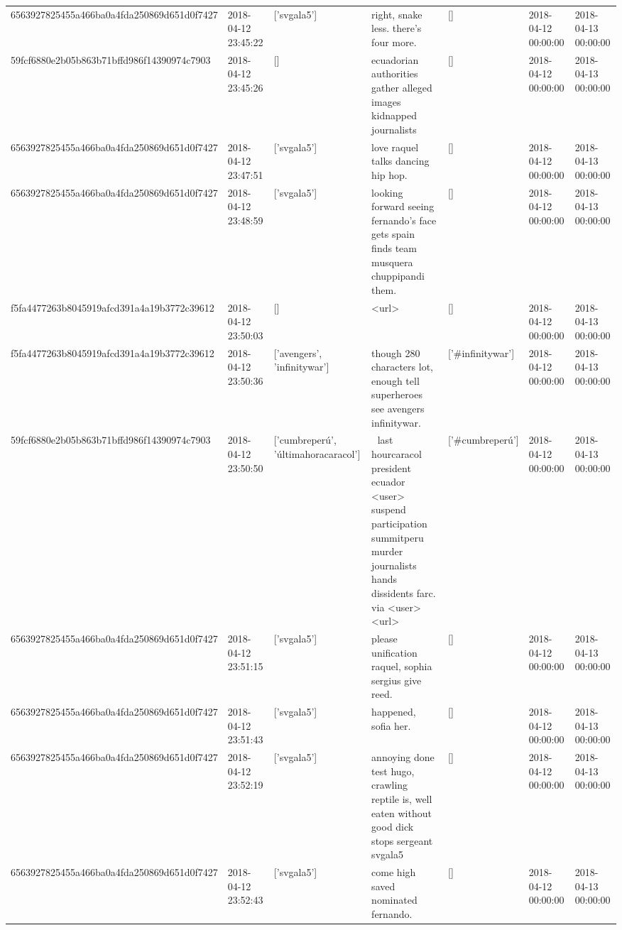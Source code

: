 \begin{tabular}{lllllll}
6563927825455a466ba0a4fda250869d651d0f7427 & 2018-04-12 23:45:22 & ['svgala5'] & right, snake less. there's four more. & [] & 2018-04-12 00:00:00 & 2018-04-13 00:00:00 \\
59fcf6880e2b05b863b71bffd986f14390974c7903 & 2018-04-12 23:45:26 & [] & ecuadorian authorities gather alleged images kidnapped journalists & [] & 2018-04-12 00:00:00 & 2018-04-13 00:00:00 \\
6563927825455a466ba0a4fda250869d651d0f7427 & 2018-04-12 23:47:51 & ['svgala5'] & love raquel talks dancing hip hop. & [] & 2018-04-12 00:00:00 & 2018-04-13 00:00:00 \\
6563927825455a466ba0a4fda250869d651d0f7427 & 2018-04-12 23:48:59 & ['svgala5'] & looking forward seeing fernando's face gets spain finds team musquera chuppipandi them. & [] & 2018-04-12 00:00:00 & 2018-04-13 00:00:00 \\
f5fa4477263b8045919afcd391a4a19b3772c39612 & 2018-04-12 23:50:03 & [] & <url> & [] & 2018-04-12 00:00:00 & 2018-04-13 00:00:00 \\
f5fa4477263b8045919afcd391a4a19b3772c39612 & 2018-04-12 23:50:36 & ['avengers', 'infinitywar'] & though 280 characters lot, enough tell superheroes see avengers infinitywar. & ['#infinitywar'] & 2018-04-12 00:00:00 & 2018-04-13 00:00:00 \\
59fcf6880e2b05b863b71bffd986f14390974c7903 & 2018-04-12 23:50:50 & ['cumbreperú', 'últimahoracaracol'] & 🔴 last hourcaracol president ecuador <user> suspend participation summitperu murder journalists hands dissidents farc. via <user> <url> & ['#cumbreperú'] & 2018-04-12 00:00:00 & 2018-04-13 00:00:00 \\
6563927825455a466ba0a4fda250869d651d0f7427 & 2018-04-12 23:51:15 & ['svgala5'] & please unification raquel, sophia sergius give reed. & [] & 2018-04-12 00:00:00 & 2018-04-13 00:00:00 \\
6563927825455a466ba0a4fda250869d651d0f7427 & 2018-04-12 23:51:43 & ['svgala5'] & happened, sofia her. & [] & 2018-04-12 00:00:00 & 2018-04-13 00:00:00 \\
6563927825455a466ba0a4fda250869d651d0f7427 & 2018-04-12 23:52:19 & ['svgala5'] & annoying done test hugo, crawling reptile is, well eaten without good dick stops sergeant svgala5 & [] & 2018-04-12 00:00:00 & 2018-04-13 00:00:00 \\
6563927825455a466ba0a4fda250869d651d0f7427 & 2018-04-12 23:52:43 & ['svgala5'] & come high saved nominated fernando. & [] & 2018-04-12 00:00:00 & 2018-04-13 00:00:00 \\

\end{tabular}

